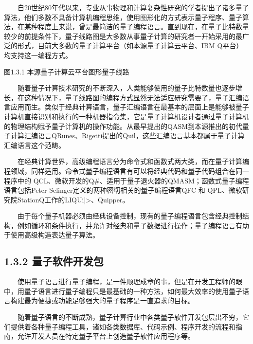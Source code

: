 \documentclass[a4paper,11pt,english]{sphinxmanual}
\begin{document}
\sphinxAtStartPar
  自20世纪80年代以来，专业从事物理和计算复杂性研究的学者提出了诸多量子算法，他们多数不具备计算机编程思维，使用图形化的方式表示量子程序、量子算法，在某种程度上来说，曾是最简洁的量子编程语言。直到现在，在量子比特数量较少的前提条件下，量子线路图是大多数从事量子计算的研究者一开始采用的最广泛的形式，目前大多数的量子计算平台（如本源量子计算云平台、IBM Q平台）均支持这一编程方式。


\begin{center}图1.3.1 本源量子计算云平台图形量子线路
\end{center}
\sphinxAtStartPar
  随着量子计算技术研究的不断深入，人类能够使用的量子比特数量也逐步增长，在这种情况下，量子线路图的编程方式显然无法适应研究需要了，量子汇编语言应用而生。类似于经典计算语言，量子汇编语言在最基本的层面上是能够被量子计算机直接识别和执行的一种机器指令集，它是量子计算机设计者通过量子计算机的物理结构赋予量子计算机的操作功能。从最早提出的QASM到本源推出的初代量子计算汇编语言QRunes、Rigetti提出的Quil，这些汇编语言基本都属于量子计算汇编语言这个范畴。

\sphinxAtStartPar
  在经典计算世界，高级编程语言分为命令式和函数式两大类，而在量子计算编程领域，同样适用。命令式量子编程语言有可以将经典代码和量子代码组合在同一程序中的 QCL、微软开发的Q\#、适用于量子退火器的QMASM；函数式量子编程语言包括Peter Selinger定义的两种密切相关的量子编程语言QFC 和 QPL、微软研究院StationQ工作的LIQUi|>、Quipper。

\sphinxAtStartPar
  由于每个量子机器必须由经典设备控制，现有的量子编程语言包含经典控制结构，例如循环和条件执行，并允许对经典和量子数据进行操作；量子编程语言有助于使用高级构造表达量子算法。


\subsection{1.3.2 量子软件开发包}
\label{\detokenize{rst/1.3_u91cf_u5b50_u8ba1_u7b97_u8f6f_u4ef6_u4ecb_u7ecd:id3}}
\sphinxAtStartPar
  使用量子语言进行量子编程，是一件顺理成章的事，但是在开发工程师的眼中，用量子语言进行量子编程只是最基础的一种方法，如何最大效率的使用量子语言构建最为便捷或功能足够强大的量子程序是一直追求的目标。

\sphinxAtStartPar
  随着量子语言的不断成熟，量子计算行业中各类量子软件开发包层出不穷，它们提供着各种量子编程工具，诸如各类数据库、代码示例、程序开发的流程和指南，允许开发人员在特定量子平台上创造量子软件应用程序等。
\end{document}
